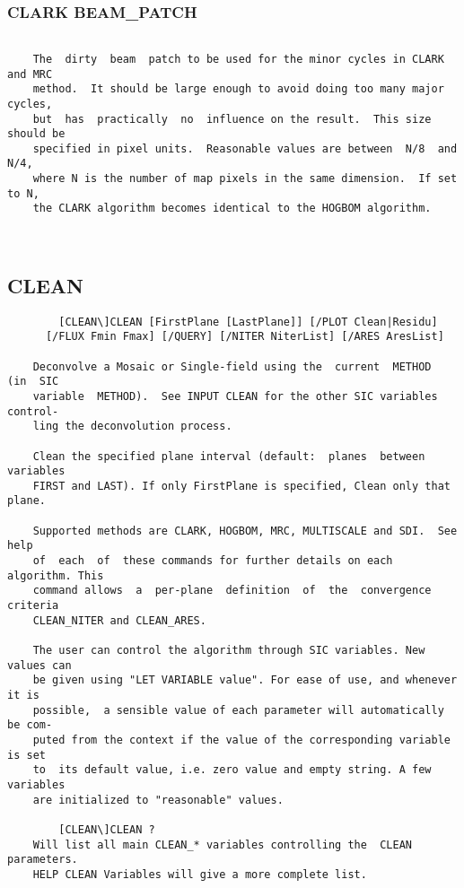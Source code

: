 \subsubsection{CLARK BEAM\_PATCH}
\begin{verbatim}

    The  dirty  beam  patch to be used for the minor cycles in CLARK and MRC
    method.  It should be large enough to avoid doing too many major cycles,
    but  has  practically  no  influence on the result.  This size should be
    specified in pixel units.  Reasonable values are between  N/8  and  N/4,
    where N is the number of map pixels in the same dimension.  If set to N,
    the CLARK algorithm becomes identical to the HOGBOM algorithm.



\end{verbatim}
\subsection{CLEAN}
\begin{verbatim}
        [CLEAN\]CLEAN [FirstPlane [LastPlane]] [/PLOT Clean|Residu]
      [/FLUX Fmin Fmax] [/QUERY] [/NITER NiterList] [/ARES AresList]

    Deconvolve a Mosaic or Single-field using the  current  METHOD  (in  SIC
    variable  METHOD).  See INPUT CLEAN for the other SIC variables control-
    ling the deconvolution process.

    Clean the specified plane interval (default:  planes  between  variables
    FIRST and LAST). If only FirstPlane is specified, Clean only that plane.

    Supported methods are CLARK, HOGBOM, MRC, MULTISCALE and SDI.  See  help
    of  each  of  these commands for further details on each algorithm. This
    command allows  a  per-plane  definition  of  the  convergence  criteria
    CLEAN_NITER and CLEAN_ARES.

    The user can control the algorithm through SIC variables. New values can
    be given using "LET VARIABLE value". For ease of use, and whenever it is
    possible,  a sensible value of each parameter will automatically be com-
    puted from the context if the value of the corresponding variable is set
    to  its default value, i.e. zero value and empty string. A few variables
    are initialized to "reasonable" values.

        [CLEAN\]CLEAN ?
    Will list all main CLEAN_* variables controlling the  CLEAN  parameters.
    HELP CLEAN Variables will give a more complete list.

\end{verbatim}
